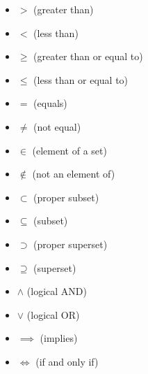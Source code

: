 \begin{itemize}

	\item \(>\)  (greater than)

	\item \(<\)  (less than)

	\item \(\geq\)  (greater than or equal to)

	\item \(\leq\)  (less than or equal to)

	\item \(=\)  (equals)

	\item \(\neq\)  (not equal)

	\item \(\in\)  (element of a set)

	\item \(\notin\)  (not an element of)

	\item \(\subset\)  (proper subset)

	\item \(\subseteq\)  (subset)

	\item \(\supset\)  (proper superset)

	\item \(\supseteq\)  (superset)

	\item \(\land\)  (logical AND)

	\item \(\lor\)  (logical OR)

	\item \(\implies\)  (implies)

	\item \(\iff\)  (if and only if)

\end{itemize}

